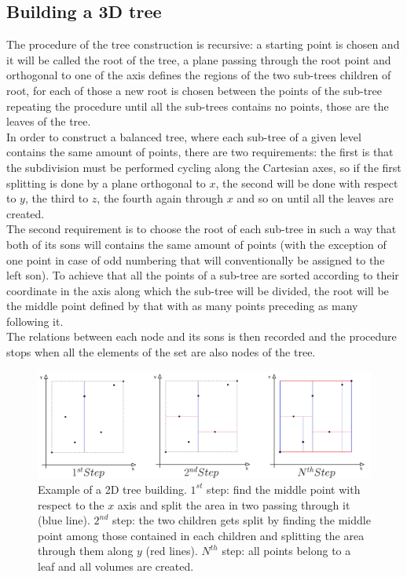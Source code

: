 \subsection{Building a 3D tree}
The procedure of the tree construction is recursive: a starting point is chosen and it will be called the root of the tree, a plane passing through the root point and orthogonal to one of the axis defines the regions of the two sub-trees children of root, for each of those a new root is chosen between the points of the sub-tree repeating the procedure until all the sub-trees contains no points, those are the leaves of the tree.\\
In order to construct a balanced tree, where each sub-tree of a given level contains the same amount of points, there are two requirements: the first is that the subdivision must be performed cycling along the Cartesian axes, so if the first splitting is done by a plane orthogonal to $x$, the second will be done with respect to $y$, the third to $z$, the fourth again through $x$ and so on until all the leaves are created.\\
The second requirement is to choose the root of each sub-tree in such a way that both of its sons will contains the same amount of points (with the exception of one point in case of odd numbering that will conventionally be assigned to the left son). To achieve that all the points of a sub-tree are sorted according to their coordinate in the axis along which the sub-tree will be divided, the root will be the middle point defined by that with as many points preceding as many following it.\\
The relations between each node and its sons is then recorded and the procedure stops when all the elements of the set are also nodes of the tree.\\

\begin{figure}
\includegraphics[width=\textwidth]{volumeKdPlot/scheme_volume_kdtree.png}
\caption{Example of a 2D tree building. $1^{st}$ step: find the middle point with respect to the $x$ axis and split the area in two passing through it (blue line). $2^{nd}$ step: the two children gets split by finding the middle point among those contained in each children and splitting the area through them along $y$ (red lines). $N^{th}$ step: all points belong to a leaf and all volumes are created.}
\label{volume_kdtree_speedup}
\end{figure}


